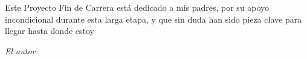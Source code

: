 
\cleardoublepage
\thispagestyle{empty} %

\begin{minipage}[c][\textheight][c]{\textwidth} %
\raggedleft %

Este Proyecto Fin de Carrera está dedicado a mis padres, por su apoyo incondicional durante esta larga etapa, y que sin duda han sido pieza clave para llegar hasta donde estoy

\bigskip

\emph{El autor}

\end{minipage}

\blankpage
